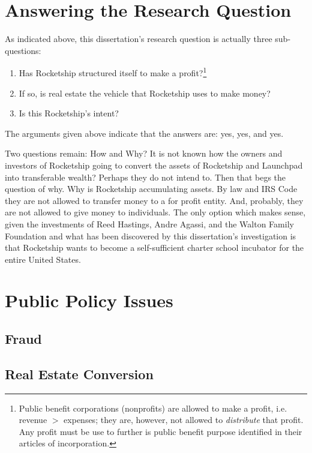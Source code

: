 \section{Answering the Research Question}%
\label{sec:answ-rese-quest}\indent%

As indicated above, this dissertation's research question is actually three sub-questions:
\begin{enumerate}
  \item Has Rocketship structured itself to make a profit?\footnote{Public benefit corporations (nonprofits) are allowed to make a profit, i.e. revenue $>$ expenses; they are, however, not allowed to \textit{distribute} that profit. Any profit must be use to further is public benefit purpose identified in their articles of incorporation.}
  \item If so, is real estate the vehicle that Rocketship uses to make money?
  \item Is this Rocketship's intent?
\end{enumerate}

The arguments given above indicate that the answers are: yes, yes, and yes.

Two questions remain: How and Why? It is not known how the owners and investors of Rocketship going to convert the assets of Rocketship and Launchpad into transferable wealth? Perhaps they do not intend to. Then that begs the question of why. Why is Rocketship accumulating assets. By law and IRS Code they are not allowed to transfer money to a for profit entity. And, probably, they are not allowed to give money to individuals. The only option which makes sense, given the investments of Reed Hastings, Andre Agassi, and the Walton Family Foundation and what has been discovered by this dissertation's investigation is that Rocketship wants to become a self-sufficient charter school incubator for the entire United States.

\section{Public Policy Issues}%
\label{sec:publ-policy-chang}\indent%

\subsection{Fraud}
\label{sec:fraud}

\subsection{Real Estate Conversion}
\label{sec:real-estate-conv}

